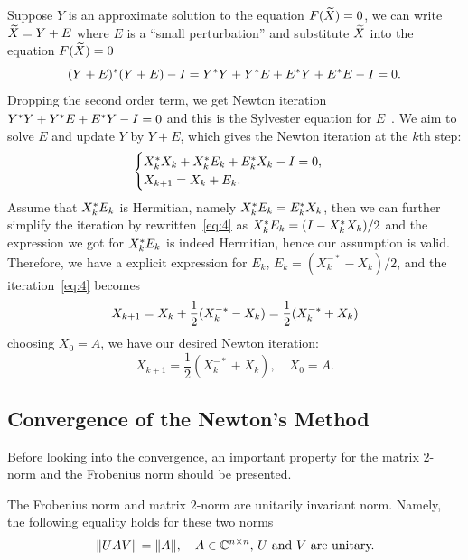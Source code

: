 \documentclass[12pt]{article}
\begin{document}
Suppose $Y$ is an approximate solution to the equation $F(\widetilde X) = 0$, we can write $\widetilde X = Y + E$ where $E$ is a ``small perturbation'' and substitute $\widetilde X$ into the equation $F(\widetilde X) = 0$
\begin{equation}\notag
    (Y+E)^* (Y+E) - I = Y^* Y + Y^* E + E^* Y + E^* E - I = 0.
\end{equation}
Dropping the second order term, we get Newton iteration $Y^* Y + Y^* E + E^* Y - I = 0$ and this is the Sylvester equation for $E$~. We aim to solve $E$ and update $Y$ by $Y + E$, which gives the Newton iteration at the $k$th step:
\begin{equation}\label{eq:4}
    \begin{cases}
        X_k ^* X_{k} + X_{k}^* E_k + E_k^* X_k - I = 0,\\
        X_{k+1} = X_{k} + E_k.
    \end{cases}
\end{equation}
Assume that $X_k^* E_k$ is Hermitian, namely $X_k^* E_k = E_k^* X_k$, then we can further simplify the iteration by rewritten~\eqref{eq:4} as $X_k^* E_k = (I - X_k^* X_k)/2$ and the expression we got for $X_k^* E_k$ is indeed Hermitian, hence our assumption is valid. Therefore, we have a explicit expression for $E_k$, $E_k = (X_k^{-*} - X_k)/2$, and the iteration~\eqref{eq:4} becomes 
\begin{equation}\notag
    X_{k+1} = X_{k} + \frac 12 (X_k^{-*}-X_k) = \frac 12(X_k^{-*} + X_k)
\end{equation}
choosing $X_0 = A$, we have our desired Newton iteration:
\begin{equation}
    \label{eq:newton-iteration}
    X_{k+1} = \frac 12(X_k^{-*} + X_k),\quad X_0 = A.
\end{equation}

\subsection{Convergence of the Newton's Method}

Before looking into the convergence, an important property for the matrix $2$-norm and the Frobenius norm should be presented.
\begin{theorem} 
    \label{thm:matrix-invariant-norm}
    The Frobenius norm and matrix $2$-norm are unitarily invariant norm. Namely, the following equality holds for these two norms
    \begin{equation}\notag
      \|{UAV}\| = \|{A}\|,\quad \text{$A\in\mathbb{C}^{n\times n}$, $U$ and $V$ are unitary.}
    \end{equation}
\end{theorem}
  
\end{document}
